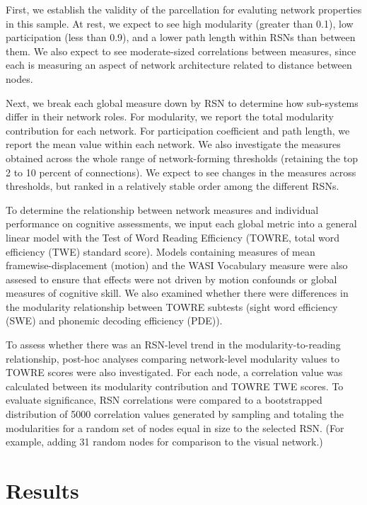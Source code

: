 \begin{itmeize}
First, we establish the validity of the parcellation for evaluting network properties in this sample. At rest, we expect to see high modularity (greater than 0.1), low participation (less than 0.9), and a lower path length within RSNs than between them. We also expect to see moderate-sized correlations between measures, since each is measuring an aspect of network architecture related to distance between nodes.  

Next, we break each global measure down by RSN to determine how sub-systems differ in their network roles. For modularity, we report the total modularity contribution for each network. For participation coefficient and path length, we report the mean value within each network. We also investigate the measures obtained across the whole range of network-forming thresholds (retaining the top 2 to 10 percent of connections). We expect to see changes in the measures across thresholds, but ranked in a relatively stable order among the different RSNs. 

To determine the relationship between network measures and individual performance on cognitive assessments, we input each global metric into a general linear model with the Test of Word Reading Efficiency (TOWRE, total word efficiency (TWE) standard score). Models containing measures of mean framewise-displacement (motion) and the WASI Vocabulary measure were also assesed to ensure that effects were not driven by motion confounds or global measures of cognitive skill. We also examined whether there were differences in the modularity relationship between TOWRE subtests (sight word efficiency (SWE) and phonemic decoding efficiency (PDE)). 

To assess whether there was an RSN-level trend in the modularity-to-reading relationship, post-hoc analyses comparing network-level modularity values to TOWRE scores were also investigated. For each node, a correlation value was calculated between its modularity contribution and TOWRE TWE scores. To evaluate significance, RSN correlations were compared to a bootstrapped distribution of 5000 correlation values generated by sampling and totaling the modularities for a random set of nodes equal in size to the selected RSN. (For example, adding 31 random nodes for comparison to the visual network.)


\section{Results} 


\end{itmeize}
